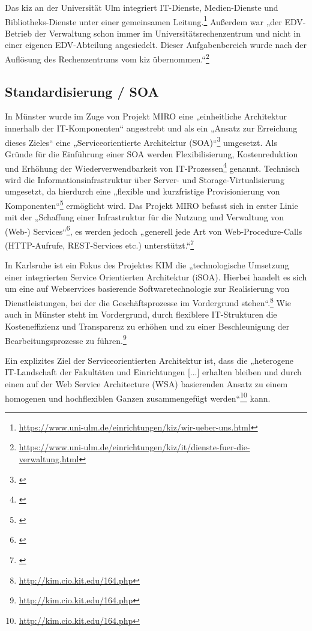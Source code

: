 Das kiz an der Universität Ulm integriert IT-Dienste, Medien-Dienste und Bibliotheks-Dienste unter einer gemeinsamen Leitung.\footnote{\url{https://www.uni-ulm.de/einrichtungen/kiz/wir-ueber-uns.html}} Außerdem war „der EDV-Betrieb der Verwaltung schon immer im Universitätsrechenzentrum und nicht in einer eigenen EDV-Abteilung angesiedelt. Dieser Aufgabenbereich wurde nach der Auflösung des Rechenzentrums vom kiz übernommen.“\footnote{\url{https://www.uni-ulm.de/einrichtungen/kiz/it/dienste-fuer-die-verwaltung.html}}

\subsection{Standardisierung / SOA}
In Münster wurde im Zuge von Projekt MIRO eine „einheitliche Architektur innerhalb der IT-Komponenten“ angestrebt und als ein „Ansatz zur Erreichung dieses Zieles“ eine „Serviceorientierte Architektur (SOA)“\footnote{\cite[51]{bode_informationsmanagement_2010}} umgesetzt. Als Gründe für die Einführung einer SOA werden Flexibilisierung, Kostenreduktion und Erhöhung der Wiederverwendbarkeit von IT-Prozessen\footnote{\cite[51]{bode_informationsmanagement_2010}} genannt. Technisch wird die Informationsinfrastruktur über Server- und Storage-Virtualisierung umgesetzt, da hierdurch eine „flexible und kurzfristige Provisionierung von Komponenten“\footnote{\cite[52]{bode_informationsmanagement_2010}} ermöglicht wird.
\newpage
Das Projekt MIRO befasst sich in erster Linie mit der „Schaffung einer Infrastruktur für die Nutzung und Verwaltung von (Web-) Services“\footnote{\cite[52]{bode_informationsmanagement_2010}}, es werden jedoch „generell jede Art von Web-Procedure-Calls (HTTP-Aufrufe, REST-Services etc.) unterstützt.“\footnote{\cite[52]{bode_informationsmanagement_2010}}

In Karlsruhe ist ein Fokus des Projektes KIM die „technologische Umsetzung einer integrierten Service Orientierten Architektur (iSOA). Hierbei handelt es sich um eine auf Webservices basierende Softwaretechnologie zur Realisierung von Dienstleistungen, bei der die Geschäftsprozesse im Vordergrund stehen“.\footnote{\url{http://kim.cio.kit.edu/164.php}}
Wie auch in Münster steht im Vordergrund, durch flexiblere IT-Strukturen die Kosteneffizienz und Transparenz zu erhöhen und zu einer Beschleunigung der Bearbeitungsprozesse zu führen.\footnote{\url{http://kim.cio.kit.edu/164.php}}

Ein explizites Ziel der Serviceorientierten Architektur ist, dass die „heterogene IT-Landschaft der Fakultäten und Einrichtungen [...] erhalten bleiben und durch einen auf der Web Service Architecture (WSA) basierenden Ansatz zu einem homogenen und hochflexiblen Ganzen zusammengefügt werden“\footnote{\url{http://kim.cio.kit.edu/164.php}} kann.

